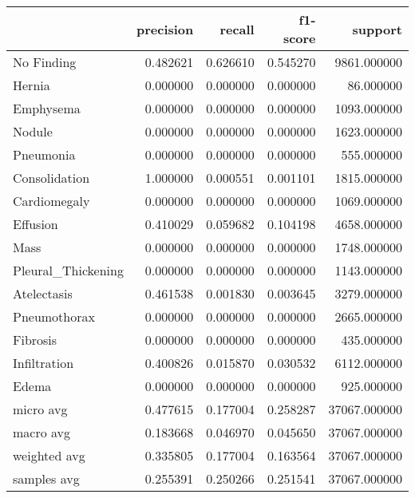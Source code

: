 \begin{tabular}{lrrrr}
\toprule
 & precision & recall & f1-score & support \\
\midrule
No Finding & 0.482621 & 0.626610 & 0.545270 & 9861.000000 \\
Hernia & 0.000000 & 0.000000 & 0.000000 & 86.000000 \\
Emphysema & 0.000000 & 0.000000 & 0.000000 & 1093.000000 \\
Nodule & 0.000000 & 0.000000 & 0.000000 & 1623.000000 \\
Pneumonia & 0.000000 & 0.000000 & 0.000000 & 555.000000 \\
Consolidation & 1.000000 & 0.000551 & 0.001101 & 1815.000000 \\
Cardiomegaly & 0.000000 & 0.000000 & 0.000000 & 1069.000000 \\
Effusion & 0.410029 & 0.059682 & 0.104198 & 4658.000000 \\
Mass & 0.000000 & 0.000000 & 0.000000 & 1748.000000 \\
Pleural_Thickening & 0.000000 & 0.000000 & 0.000000 & 1143.000000 \\
Atelectasis & 0.461538 & 0.001830 & 0.003645 & 3279.000000 \\
Pneumothorax & 0.000000 & 0.000000 & 0.000000 & 2665.000000 \\
Fibrosis & 0.000000 & 0.000000 & 0.000000 & 435.000000 \\
Infiltration & 0.400826 & 0.015870 & 0.030532 & 6112.000000 \\
Edema & 0.000000 & 0.000000 & 0.000000 & 925.000000 \\
micro avg & 0.477615 & 0.177004 & 0.258287 & 37067.000000 \\
macro avg & 0.183668 & 0.046970 & 0.045650 & 37067.000000 \\
weighted avg & 0.335805 & 0.177004 & 0.163564 & 37067.000000 \\
samples avg & 0.255391 & 0.250266 & 0.251541 & 37067.000000 \\
\bottomrule
\end{tabular}
